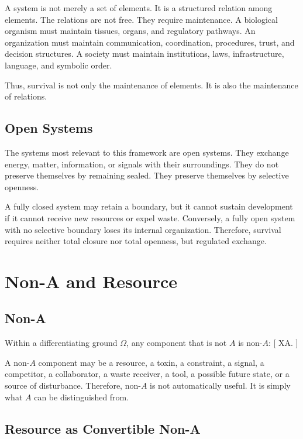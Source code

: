 \documentclass[11pt,a4paper]{article}
\begin{document}
A system is not merely a set of elements. It is a structured relation among elements. The relations are not free. They require maintenance. A biological organism must maintain tissues, organs, and regulatory pathways. An organization must maintain communication, coordination, procedures, trust, and decision structures. A society must maintain institutions, laws, infrastructure, language, and symbolic order.

Thus, survival is not only the maintenance of elements. It is also the maintenance of relations.

\subsection{Open Systems}

The systems most relevant to this framework are open systems. They exchange energy, matter, information, or signals with their surroundings. They do not preserve themselves by remaining sealed. They preserve themselves by selective openness.

A fully closed system may retain a boundary, but it cannot sustain development if it cannot receive new resources or expel waste. Conversely, a fully open system with no selective boundary loses its internal organization. Therefore, survival requires neither total closure nor total openness, but regulated exchange.

\section{Non-A and Resource}

\subsection{Non-A}

Within a differentiating ground $\Omega$, any component that is not $A$ is non-$A$:
[
X\in\Omega\setminus A.
]

A non-$A$ component may be a resource, a toxin, a constraint, a signal, a competitor, a collaborator, a waste receiver, a tool, a possible future state, or a source of disturbance. Therefore, non-$A$ is not automatically useful. It is simply what $A$ can be distinguished from.

\subsection{Resource as Convertible Non-A}
\end{document}
